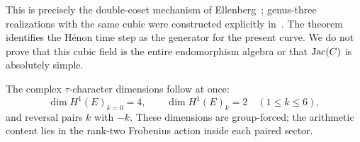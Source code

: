This is precisely the double-coset mechanism of
Ellenberg~\cite{ellenberg2001endomorphism}; genus-three realizations with the
same cubic were constructed explicitly in~\cite{hoffman2016genus3}.  The
theorem identifies the H\'enon time step as the generator for the present
curve.  We do not prove that this cubic field is the entire endomorphism
algebra or that $\operatorname{Jac}(C)$ is absolutely simple.

The complex $\tau$-character dimensions follow at once:
\[
 \dim H^1(E)_{k=0}=4,
 \qquad
 \dim H^1(E)_{k}=2\quad(1\le k\le6),
\]
and reversal pairs $k$ with $-k$.  These dimensions are group-forced; the
arithmetic content lies in the rank-two Frobenius action inside each paired
sector.
